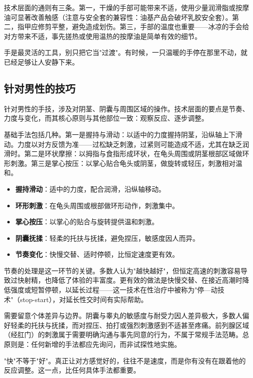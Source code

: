 \documentclass[12pt,UTF8]{ctexbook}
\newcommand{\keyword}[1]{\textbf{#1}}
\begin{document}
技术层面的通则有三条。第一，干燥的手部可能带来不适，使用少量润滑脂或按摩油可显著改善触感（注意与安全套的兼容性：油基产品会破坏乳胶安全套）。第二，指甲应修剪平整，避免造成划伤。第三，手部的温度也重要——冰凉的手会给对方带来不适，事先搓热或使用温热的按摩油是简单有效的细节。

\begin{tcolorbox}[colback=pink!5!white,colframe=red!50!black,title=贴心小叮咛]
手是最灵活的工具，别只把它当"过渡"。有时候，一只温暖的手停在那里不动，就已经足够让人安静下来。
\end{tcolorbox}
\subsection{针对男性的技巧}

针对男性的手技，涉及对阴茎、阴囊与周围区域的操作。技术层面的要点是节奏、力度与变化，而其核心原则与其他部位一致：观察反应、逐步调整。

基础手法包括几种。第一是握持与滑动：以适中的力度握持阴茎，沿纵轴上下滑动。力度以对方反馈为准——过松缺乏刺激，过紧则可能造成不适，尤其在缺乏润滑时。第二是环状摩擦：以拇指与食指形成环状，在龟头周围或阴茎根部区域做环形刺激。第三是掌心按压：以掌心贴合龟头或阴茎，做旋转或轻压，刺激相对温和。

\begin{itemize}
  \item \keyword{握持滑动}：适中的力度，配合润滑，沿纵轴移动。
  \item \keyword{环形刺激}：在龟头周围或根部做环形动作，刺激集中。
  \item \keyword{掌心按压}：以掌心的贴合与旋转提供温和刺激。
  \item \keyword{阴囊抚揉}：轻柔的托扶与抚揉，避免捏压，敏感度因人而异。
  \item \keyword{节奏变化}：快慢交替、适时停顿，比恒定速度更有效。
\end{itemize}

节奏的处理是这一环节的关键。多数人认为"越快越好"，但恒定高速的刺激容易导致过快射精，也降低了体验的丰富度。更有效的做法是快慢交替、在接近高潮时降低强度或短暂停顿，以延长过程——这一技术在性治疗中被称为"停—动技术"（stop-start），对延长性交时间有实际帮助。

需要留意个体差异与边界。阴囊与睾丸的敏感度与耐受力因人差异极大，多数人偏好轻柔的托扶与抚揉，而对捏压、拍打或强烈刺激感到不适甚至疼痛。前列腺区域（经肛门）的刺激属于需要明确沟通与事先同意的行为，不属于常规手法范畴。总原则是：任何新增的手法都应先询问，而非试探性地实施。

\begin{tcolorbox}[colback=pink!5!white,colframe=red!50!black,title=贴心小叮咛]
"快"不等于"好"。真正让对方感觉好的，往往不是速度，而是你有没有在跟着他的反应调整。这一点，比任何具体手法都重要。
\end{tcolorbox}
\end{document}
